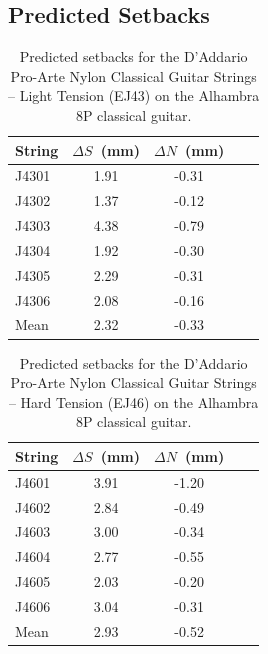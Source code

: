  \subsection{Predicted Setbacks}
\begin{table}%
  \centering
  \caption{\label{tbl:ej43_setbacks} Predicted setbacks for the D'Addario Pro-Arte Nylon Classical Guitar Strings -- Light Tension (EJ43) on the Alhambra 8P classical guitar.}
    \begin{tabular}{lcccc}
    \hline \hline
    String  & $\Delta S$~(mm) & $\Delta N$~(mm) \\
    \hline
    J4301 & 1.91 & -0.31 \\
    J4302 & 1.37 & -0.12 \\
    J4303 & 4.38 & -0.79 \\
    J4304 & 1.92 & -0.30 \\
    J4305 & 2.29 & -0.31 \\
    J4306 & 2.08 & -0.16 \\
    \hline \hline
    Mean & 2.32 & -0.33 \\
    \hline
    \end{tabular}%
  \label{tab:addlabel}%
\end{table}%

\begin{table}%
  \centering
  \caption{\label{tbl:ej46_setbacks} Predicted setbacks for the D'Addario Pro-Arte Nylon Classical Guitar Strings -- Hard Tension (EJ46) on the Alhambra 8P classical guitar.}
    \begin{tabular}{lcccc}
    \hline \hline
    String  & $\Delta S$~(mm) & $\Delta N$~(mm) \\
    \hline
    J4601 & 3.91 & -1.20 \\
    J4602 & 2.84 & -0.49 \\
    J4603 & 3.00 & -0.34 \\
    J4604 & 2.77 & -0.55 \\
    J4605 & 2.03 & -0.20 \\
    J4606 & 3.04 & -0.31 \\
    \hline \hline
    Mean & 2.93 & -0.52 \\
    \hline
    \end{tabular}%
  \label{tab:addlabel}%
\end{table}%

